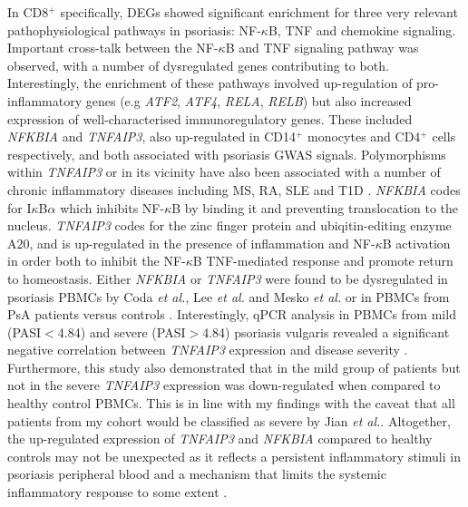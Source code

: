 In CD8$^+$ specifically, DEGs showed significant enrichment for three very relevant pathophysiological pathways in psoriasis: NF-$\kappa$B, TNF and chemokine signaling. Important cross-talk between the NF-$\kappa$B and TNF signaling pathway was observed, with a number of dysregulated genes contributing to both. Interestingly, the enrichment of these pathways involved up-regulation of pro-inflammatory genes (e.g \textit{ATF2}, \textit{ATF4}, \textit{RELA}, \textit{RELB}) but also increased expression of well-characterised immunoregulatory genes. These included \textit{NFKBIA} and \textit{TNFAIP3}, also up-regulated in CD14$^+$ monocytes and CD4$^+$ cells respectively, and both associated with psoriasis GWAS signals.  Polymorphisms within \textit{TNFAIP3} or in its vicinity have also been associated with a number of chronic inflammatory diseases including MS, RA, SLE and T1D \parencite{Vereecke2011}. \textit{NFKBIA} codes for I$\kappa$B$\alpha$ which inhibits NF-$\kappa$B by binding it and preventing translocation to the nucleus. \textit{TNFAIP3} codes for the zinc finger protein and ubiqitin-editing enzyme A20, and is up-regulated in the presence of inflammation and NF-$\kappa$B activation in order both to inhibit the NF-$\kappa$B TNF-mediated response and promote return to homeostasis. Either \textit{NFKBIA} or \textit{TNFAIP3} were found to be dysregulated in psoriasis PBMCs by Coda \textit{et al.}, Lee \textit{et al.} and Mesko \textit{et al.} or in PBMCs from PsA patients versus controls \parencite{Dolcino2015}. Interestingly, qPCR analysis in PBMCs from mild (PASI$<$4.84) and severe (PASI$>$4.84) psoriasis vulgaris revealed a significant negative correlation between \textit{TNFAIP3} expression and disease severity \parencite{Jiang2012}. Furthermore, this study also demonstrated that in the mild group of patients but not in the severe \textit{TNFAIP3} expression was down-regulated when compared to healthy control PBMCs. This is in line with my findings with the caveat that all patients from my cohort would be classified as severe by Jian \textit{et al.}. Altogether, the up-regulated expression of \textit{TNFAIP3} and \textit{NFKBIA} compared to healthy controls may not be unexpected as it reflects a persistent inflammatory stimuli in psoriasis peripheral blood and a mechanism that limits the systemic inflammatory response to some extent \parencite{Idel2003}. 

